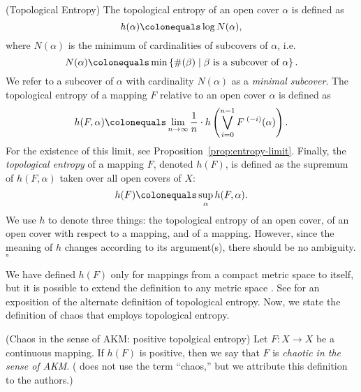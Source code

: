 \documentclass[10pt,twoside,draft]{book}
\begin{document}
\begin{definition}
  (Topological Entropy)
  The topological entropy of an open cover $\alpha$ is defined as
  \begin{equation*}
    h(\alpha) \ceq \log N(\alpha),
  \end{equation*}
  where $N(\alpha)$ is the minimum of cardinalities of subcovers of $\alpha$, i.e.
  \begin{equation*}
    N(\alpha) \ceq \min\setst{ \#(\beta) }{ \beta \mbox{ is a subcover of } \alpha}.
  \end{equation*}
  We refer to a subcover of $\alpha$ with cardinality $N(\alpha)$ as a \textit{minimal subcover}.
  The topological entropy of a mapping $F$ relative to an open cover $\alpha$ is defined as
  \begin{equation*}
    h(F,\alpha) \ceq \lim\limits_{n \to \infty} \frac{1}{n} \cdot h\paren{ \bigvee\limits_{i=0}^{n-1} \itr{F}{(-i)}(\alpha) }.
  \end{equation*}
  For the existence of this limit, see Proposition~\ref{prop:entropy-limit}.
  Finally, the \textit{topological entropy} of a mapping $F$, denoted $h(F)$, is defined as the supremum of $h(F, \alpha)$ taken over all open covers of $X$:
  \begin{equation*}
    h(F) \ceq \sup\limits_\alpha h(F,\alpha).
  \end{equation*}
  We use $h$ to denote three things: the topological entropy of an open cover, of an open cover with respect to a mapping, and of a mapping.
  However, since the meaning of $h$ changes according to its argument(s), there should be no ambiguity.
  $\square$
  \label{defn:t-entropy}
\end{definition}
We have defined $h(F)$ only for mappings from a compact metric space to itself, but it is possible to extend the definition to any metric space \citep{bowen}.
See \citep{walters} for an exposition of the alternate definition of topological entropy.
Now, we state the definition of chaos that employs topological entropy.
\begin{definition}
  (Chaos in the sense of AKM: positive topolgical entropy) 
  Let $F: X \to X$ be a continuous mapping.
  If $h(F)$ is positive, then we say that $F$ is \textit{chaotic in the sense of AKM}.
  (\citet{akm} does not use the term ``chaos,'' but we attribute this definition to the authors.)
\end{definition}
\end{document}
